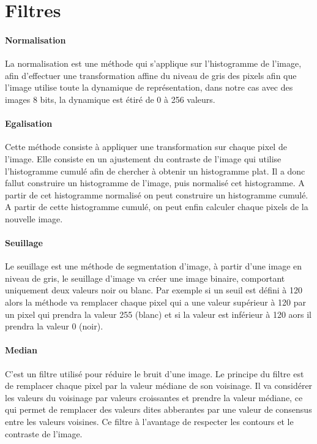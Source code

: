 \section{Filtres}
	
	\paragraph{Normalisation}
	\label{Normalisation}
	La normalisation est une méthode qui s'applique sur l'histogramme de l'image, afin d'effectuer une transformation affine du niveau de gris des pixels afin que l'image utilise toute la dynamique de représentation, dans notre cas avec des images 8 bits, la dynamique est étiré de 0 à 256 valeurs.


	\paragraph{Egalisation}

	\label{Egalisation}
	Cette méthode consiste à appliquer une transformation sur chaque pixel de l'image. Elle consiste en un ajustement du contraste de l'image qui utilise l'histogramme cumulé afin de chercher à obtenir un histogramme plat. Il a donc fallut construire un histogramme de l'image, puis normalisé cet histogramme. A partir de cet histogramme normalisé on peut construire un histogramme cumulé. A partir de cette histogramme cumulé, on peut enfin calculer chaque pixels de la nouvelle image.

	
	\paragraph{Seuillage}
	\label{Seuillage}

	Le seuillage est une méthode de segmentation d'image, à partir d'une image en niveau de gris, le seuillage d'image va créer une image binaire, comportant uniquement deux valeurs noir ou blanc. Par exemple si un seuil est défini à 120 alors la méthode va remplacer chaque pixel qui a une valeur supérieur à 120 par un pixel qui prendra la valeur 255  (blanc) et si la valeur est inférieur à 120 aors il prendra la valeur 0 (noir).

	\paragraph{Median}
	\label{Median}

	C'est un filtre utilisé pour réduire le bruit d'une image. Le principe du filtre est de remplacer chaque pixel par la valeur médiane de son voisinage. Il va considérer les valeurs du voisinage par valeurs croissantes et prendre la valeur médiane, ce qui permet de remplacer des valeurs dites abberantes par une valeur de consensus entre les valeurs voisines. Ce filtre à l'avantage de respecter les contours et le contraste de l'image.

